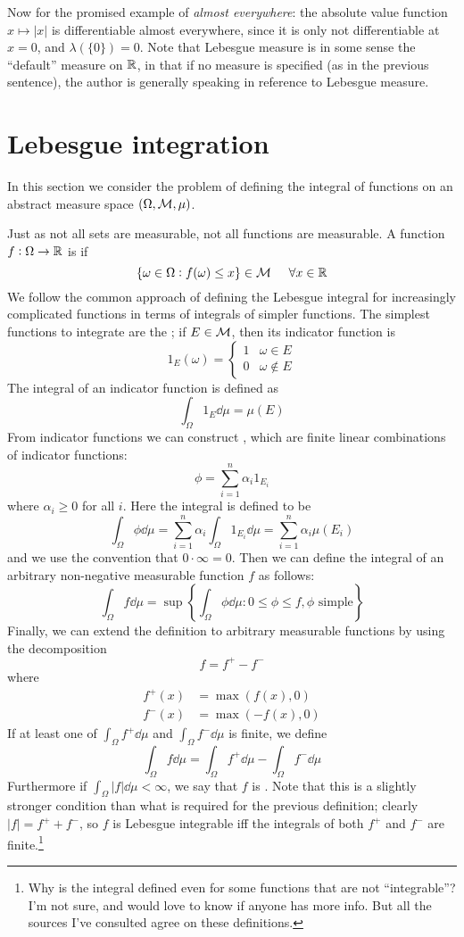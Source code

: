 \documentclass{article}
\begin{document}
Now for the promised example of \textit{almost everywhere}: the absolute value function $x \mapsto |x|$ is differentiable almost everywhere, since it is only not differentiable at $x = 0$, and $\lambda(\{0\}) = 0$.
Note that Lebesgue measure is in some sense the ``default'' measure on $\mathbb{R}$, in that if no measure is specified (as in the previous sentence), the author is generally speaking in reference to Lebesgue measure.

\section{Lebesgue integration}
In this section we consider the problem of defining the integral of functions on an abstract measure space $(\Omega, \mathcal{M}, \mu)$.

Just as not all sets are measurable, not all functions are measurable.
A function $f : \Omega \to \mathbb{R}$ is  if
\[\{\omega \in \Omega : f(\omega) \leq x\} \in \mathcal{M} \hspace{0.5cm} \forall x \in \mathbb{R}\]
We follow the common approach of defining the Lebesgue integral for increasingly complicated functions in terms of integrals of simpler functions.
The simplest functions to integrate are the ; if $E \in \mathcal{M}$, then its indicator function is
\[1_E(\omega) = \begin{cases}
1 & \omega \in E \\
0 & \omega \not\in E
\end{cases}\]
The integral of an indicator function is defined as
\[\int_\Omega 1_E\dd{\mu} = \mu(E)\]
From indicator functions we can construct , which are finite linear combinations of indicator functions:
\[\phi = \sum_{i=1}^n \alpha_i1_{E_i}\]
where $\alpha_i \geq 0$ for all $i$.
Here the integral is defined to be
\[\int_\Omega \phi\dd{\mu} = \sum_{i=1}^n \alpha_i \int_\Omega 1_{E_i}\dd{\mu} = \sum_{i=1}^n \alpha_i \mu(E_i)\]
and we use the convention that $0 \cdot \infty = 0$.
Then we can define the integral of an arbitrary non-negative measurable function $f$ as follows:
\[\int_\Omega f\dd{\mu} = \sup\left\{\int_\Omega \phi\dd{\mu} : 0 \leq \phi \leq f, \text{$\phi$ simple}\right\}\]
Finally, we can extend the definition to arbitrary measurable functions by using the decomposition
\[f = f^+ - f^-\]
where
\begin{align*}
f^+(x) &= \max(f(x), 0) \\
f^-(x) &= \max(-f(x), 0)
\end{align*}
If at least one of $\int_\Omega f^+\dd{\mu}$ and $\int_\Omega f^-\dd{\mu}$ is finite, we define
\[\int_\Omega f\dd{\mu} = \int_\Omega f^+\dd{\mu} - \int_\Omega f^-\dd{\mu}\]
Furthermore if $\int_\Omega |f|\dd{\mu} < \infty$, we say that $f$ is .
Note that this is a slightly stronger condition than what is required for the previous definition; clearly $|f| = f^+ + f^-$, so $f$ is Lebesgue integrable iff the integrals of both $f^+$ and $f^-$ are finite.\footnote{
    Why is the integral defined even for some functions that are not ``integrable''?
    I'm not sure, and would love to know if anyone has more info.
    But all the sources I've consulted agree on these definitions.
}
\end{document}
